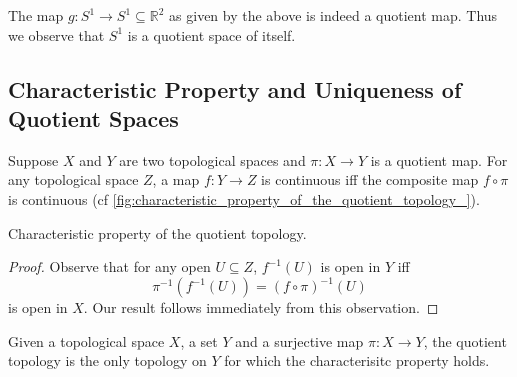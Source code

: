 \documentclass[notoc,notitlepage]{tufte-book}
\begin{document}
\begin{eg}
  The map $g : S^1 \to S^1 \subseteq \mathbb{R}^2$ as given by the above is indeed a quotient map.
  Thus we observe that $S^1$ is a quotient space of itself.
\end{eg}

\subsection{Characteristic Property and Uniqueness of Quotient Spaces}%
\label{sub:characteristic_property_and_uniqueness_of_quotient_spaces}

\begin{thm}\label{thm:characteristic_property_of_the_quotient_topology}
  Suppose $X$ and $Y$ are two topological spaces and $\pi : X \to Y$ is a quotient map. For any
  topological space $Z$, a map $f : Y \to Z$ is continuous iff the composite map $f \circ \pi$
  is continuous (cf \cref{fig:characteristic_property_of_the_quotient_topology_}).
  \begin{marginfigure}
    \centering
    \caption{Characteristic property of the quotient topology.}\label{fig:characteristic_property_of_the_quotient_topology_}
  \end{marginfigure}
\end{thm}

\begin{proof}
  Observe that for any open $U \subseteq Z$, $f^{-1}(U)$ is open in $Y$ iff
  \begin{equation*}
    \pi^{-1}(f^{-1}(U)) = (f \circ \pi)^{-1}(U)
  \end{equation*}
  is open in $X$. Our result follows immediately from this observation.
\end{proof}

\begin{thm}\label{thm:uniqueness_of_the_quotient_topology}
  Given a topological space $X$, a set $Y$ and a surjective map $\pi : X \to Y$, the quotient
  topology is the only topology on $Y$ for which the characterisitc property holds.
\end{thm}
\end{document}
